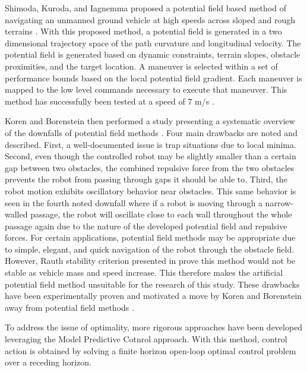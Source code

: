 \documentclass[12pt,onecolumn]{report}
\begin{document}
Shimoda, Kuroda, and Iagnemma proposed a potential field based method of navigating an unmanned ground vehicle at high speeds across sloped and rough terrains \cite{Shimoda&Kuroda&Iagnemma2007}. With this proposed method, a potential field is generated in a two dimensional trajectory space of the path curvature and longitudinal velocity. The potential field is generated based on dynamic constraints, terrain slopes, obstacle proximities, and the target location. A maneuver is selected within a set of performance bounds based on the local potential field gradient. Each maneuver is mapped to the low level commands necessary to execute that maneuver. This method has successfully been tested at a speed of 7 m/s \cite{Shimoda&Kuroda&Iagnemma2007}.

Koren and Borenstein then performed a study presenting a systematic overview of the downfalls of potential field methods \cite{Koren&Borenstein1991}. Four main drawbacks are noted and described. First, a well-documented issue is trap situations due to local minima. Second, even though the controlled robot may be slightly smaller than a certain gap between two obstacles, the combined repulsive force from the two obstacles prevents the robot from passing through gaps it should be able to. Third, the robot motion exhibits oscillatory behavior near obstacles. This same behavior is seen in the fourth noted downfall where if a robot is moving through a narrow-walled passage, the robot will oscillate close to each wall throughout the whole passage again due to the nature of the developed potential field and repulsive forces. For certain applications, potential field methods may be appropriate due to simple, elegant, and quick navigation of the robot through the obstacle field. However, Rauth stability criterion presented in \cite{Koren&Borenstein1991} prove this method would not be stable as vehicle mass and speed increase. This therefore makes the artificial potential field method unsuitable for the research of this study. These drawbacks have been experimentally proven and motivated a move by Koren and Borenstein away from potential field methods \cite{Koren&Borenstein1991}.

To address the issue of optimality, more rigorous approaches have been developed leveraging the Model Predictive Cotnrol approach. With this method, control action is obtained by solving a finite horizon open-loop optimal control problem over a receding horizon.
\end{document}
